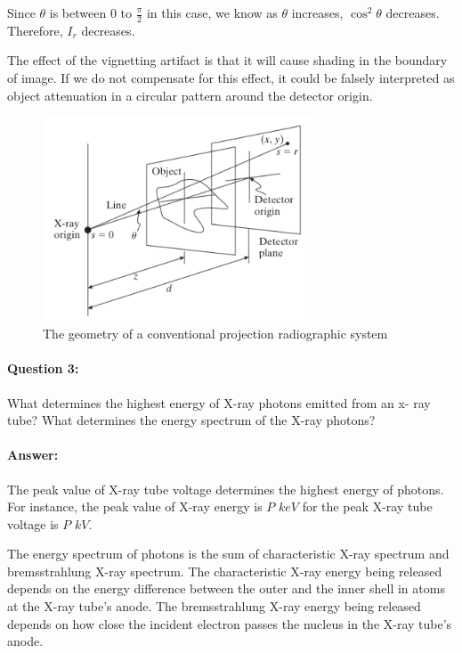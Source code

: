\documentclass[12pt, letter]{article}
\begin{document}
Since $\theta$ is between $0$ to $\frac{\pi}{2}$ in this case, we know as $\theta$ increases, $\cos^2{\theta}$ decreases. Therefore, $I_r$ decreases. 

The effect of the vignetting artifact is that it will cause shading in the boundary of image. If we do not compensate for this effect, it could be falsely interpreted as object attenuation in a circular pattern around the detector origin. 

\begin{figure}%
    \centering
    \includegraphics[width=8cm]{geometry_of_project.png}
    \caption{The geometry of a conventional projection radiographic system}
    \label{fig:geometry_of_project}%
\end{figure}

\paragraph{Question 3:} What determines the highest energy of X-ray photons emitted from an x- ray tube? What determines the energy spectrum of the X-ray photons?

\paragraph{Answer: } The peak value of X-ray tube voltage determines the highest energy of photons. For instance, the peak value of X-ray energy is $P$ $keV$ for the peak X-ray tube voltage is $P$ $kV$. 

The energy spectrum of photons is the sum of characteristic X-ray spectrum and bremsstrahlung X-ray spectrum. The characteristic X-ray energy being released depends on the energy difference between the outer and the inner shell in atoms at the X-ray tube's anode. The bremsstrahlung X-ray energy being released depends on how close the incident electron passes the nucleus in the X-ray tube's anode.  
\end{document}
